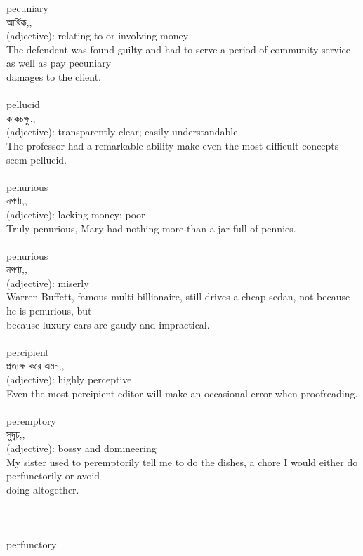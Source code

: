 \documentclass{article}
\begin{document}
{{pecuniary}\\
{আর্থিক,,}\\
{(adjective): relating to or involving money\\The defendent was found guilty and had to serve a period of community service as well as pay pecuniary\\damages to the client.\\}\\
{pellucid}\\
{কাকচক্ষু,,}\\
{(adjective): transparently clear; easily understandable\\The professor had a remarkable ability make even the most difficult concepts seem pellucid.\\}\\
{penurious}\\
{নগণ্য,,}\\
{(adjective): lacking money; poor\\Truly penurious, Mary had nothing more than a jar full of pennies.\\}\\
{penurious}\\
{নগণ্য,,}\\
{(adjective): miserly\\Warren Buffett, famous multi-billionaire, still drives a cheap sedan, not because he is penurious, but\\because luxury cars are gaudy and impractical.\\}\\
{percipient}\\
{প্রত্যক্ষ করে এমন,,}\\
{(adjective): highly perceptive\\Even the most percipient editor will make an occasional error when proofreading.\\}\\
{peremptory}\\
{সুদৃঢ়,,}\\
{(adjective): bossy and domineering\\My sister used to peremptorily tell me to do the dishes, a chore I would either do perfunctorily or avoid\\doing altogether.\\\\                                                                                \\}\\
{perfunctory}\\
}
\end{document}
